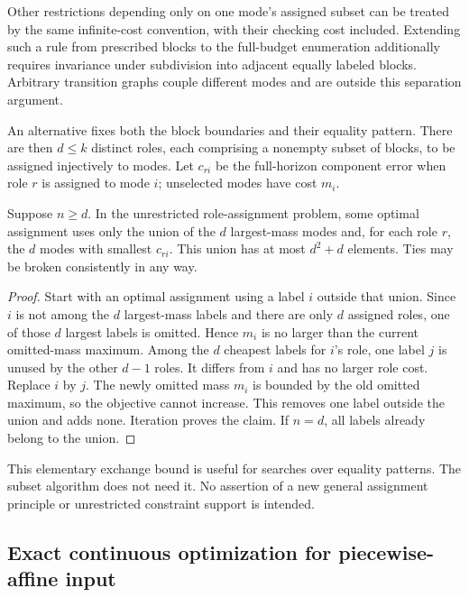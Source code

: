 Other restrictions depending only on one mode's assigned subset can be
treated by the same infinite-cost convention, with their checking cost
included. Extending such a rule from prescribed blocks to the full-budget
enumeration additionally requires invariance under subdivision into adjacent
equally labeled blocks. Arbitrary transition graphs couple different modes
and are outside this separation argument.

An alternative fixes both the block boundaries and their equality pattern.
There are then $d\le k$ distinct roles, each comprising a nonempty subset
of blocks, to be assigned injectively to modes. Let $c_{ri}$ be the
full-horizon component error when role $r$ is assigned to mode $i$;
unselected modes have cost $m_i$.

\begin{lemma}\label{lem:candidate-labels}
Suppose $n\ge d$. In the unrestricted role-assignment problem, some optimal
assignment uses only the union of the $d$ largest-mass modes and, for each
role $r$, the $d$ modes with smallest $c_{ri}$. This union has at most
$d^2+d$ elements. Ties may be broken consistently in any way.
\end{lemma}
\begin{proof}
Start with an optimal assignment using a label $i$ outside that union. Since
$i$ is not among the $d$ largest-mass labels and there are only $d$ assigned
roles, one of those $d$ largest labels is omitted. Hence $m_i$ is no larger
than the current omitted-mass maximum. Among the $d$ cheapest labels for
$i$'s role, one label $j$ is unused by the other $d-1$ roles. It differs
from $i$ and has no larger role cost. Replace $i$ by $j$. The newly omitted
mass $m_i$ is bounded by the old omitted maximum, so the objective cannot
increase. This removes one label outside the union and adds none. Iteration
proves the claim. If $n=d$, all labels already belong to the union.
\end{proof}
This elementary exchange bound is useful for searches over equality patterns.
The subset algorithm does not need it. No assertion of a new general
assignment principle or unrestricted constraint support is intended.

\subsection{Exact continuous optimization for piecewise-affine input}

